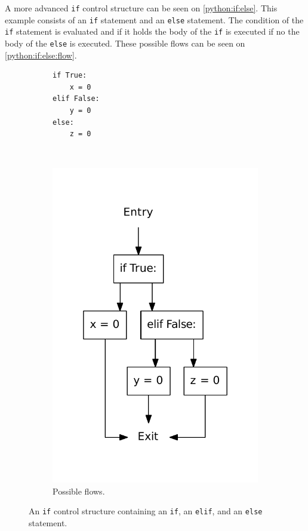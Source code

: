 A more advanced \texttt{if} control structure can be seen on \cref{python:if:else}.
This example consists of an \texttt{if} statement and an \texttt{else} statement.
The condition of the \texttt{if} statement is evaluated and if it holds the body of the \texttt{if} is executed if no the body of the \texttt{else} is executed.
These possible flows can be seen on \cref{python:if:else:flow}.


\begin{figure}
  \centering
  \begin{subfigure}[b]{0.4\textwidth}
    \begin{lstlisting}[style=python, caption={Code example.}, label={python:if:elif:code}]
if True:
    x = 0
elif False:
    y = 0
else:
    z = 0
    \end{lstlisting}
  \end{subfigure}
  ~ %
  \begin{subfigure}[b]{0.4\textwidth}
    \centering
    \includegraphics[scale=.5]{./figures/if_else_elif.pdf}
    \caption{Possible flows.}
    \label{python:if:elif:flow}
  \end{subfigure}
  \caption{An \texttt{if} control structure containing an \texttt{if}, an \texttt{elif}, and an \texttt{else} statement.}
  \label{python:if:elif}
\end{figure}


